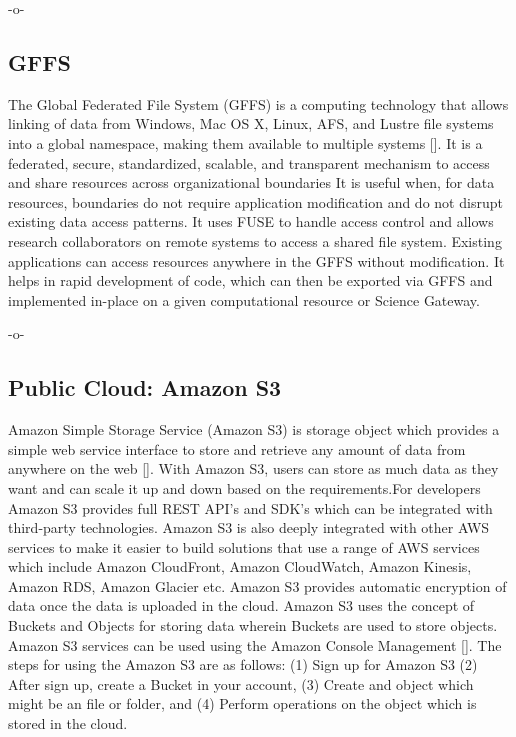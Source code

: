      -o-

\subsection{GFFS}

The Global Federated File System (GFFS) is a computing technology that
allows linking of data from Windows, Mac OS X, Linux, AFS, and Lustre
file systems into a global namespace, making them available to
multiple systems [\cite{www-gffs}].  It is a federated, secure,
standardized, scalable, and transparent mechanism to access and share
resources across organizational boundaries It is useful when, for data
resources, boundaries do not require application modification and do
not disrupt existing data access patterns. It uses FUSE to handle
access control and allows research collaborators on remote systems to
access a shared file system. Existing applications can access
resources anywhere in the GFFS without modification. It helps in rapid
development of code, which can then be exported via GFFS and
implemented in-place on a given computational resource or Science
Gateway.

     -o-
     
\subsection{Public Cloud: Amazon S3}

Amazon Simple Storage Service (Amazon S3) is storage object which
provides a simple web service interface to store and retrieve any
amount of data from anywhere on the web [\cite{www-amazon-s3}]. With
Amazon S3, users can store as much data as they want and can scale it
up and down based on the requirements.For developers Amazon S3
provides full REST API's and SDK's which can be integrated with
third-party technologies. Amazon S3 is also deeply integrated with
other AWS services to make it easier to build solutions that use a
range of AWS services which include Amazon CloudFront, Amazon
CloudWatch, Amazon Kinesis, Amazon RDS, Amazon Glacier etc. Amazon S3
provides automatic encryption of data once the data is uploaded in the
cloud. Amazon S3 uses the concept of Buckets and Objects for storing
data wherein Buckets are used to store objects. Amazon S3 services can
be used using the Amazon Console
Management [\cite{www-amazon-s3-docs}]. The steps for using the Amazon
S3 are as follows: (1) Sign up for Amazon S3 (2) After sign up, create
a Bucket in your account, (3) Create and object which might be an file
or folder, and (4) Perform operations on the object which is stored in
the cloud.

